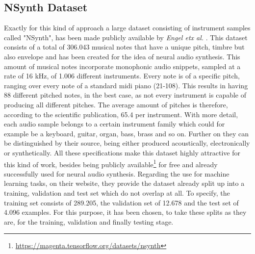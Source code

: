 \subsection{NSynth Dataset}
Exactly for this kind of approach a large dataset consisting of instrument samples called "NSynth", has been made publicly available by \textit{Engel etx al.} \cite{Engel2017}. This dataset consists of a total of 306.043 musical notes that have a unique pitch, timbre but also envelope and has been created for the idea of neural audio synthesis. This amount of musical notes incorporate monophonic audio snippets, sampled at a rate of 16 kHz, of 1.006 different instruments. Every note is of a specific pitch, ranging over every note of a standard midi piano (21-108). This results in having 88 different pitched notes, in the best case, as not every instrument is capable of producing all different pitches. The average amount of pitches is therefore, according to the scientific publication, 65.4 per instrument. With more detail, each audio sample belongs to a certain instrument family which could for example be a keyboard, guitar, organ, bass, brass and so on. Further on they can be distinguished by their source, being either produced acoustically, electronically or synthetically. All these specifications make this dataset highly attractive for this kind of work, besides being publicly available\footnote{\url{https://magenta.tensorflow.org/datasets/nsynth}} for free and already successfully used for neural audio synthesis. Regarding the use for machine learning tasks, on their website, they provide the dataset already split up into a training, validation and test set which do not overlap at all. To specify, the training set consists of 289.205, the validation set of 12.678 and the test set of 4.096 examples. For this purpose, it has been chosen, to take these splits as they are, for the training, validation and finally testing stage.